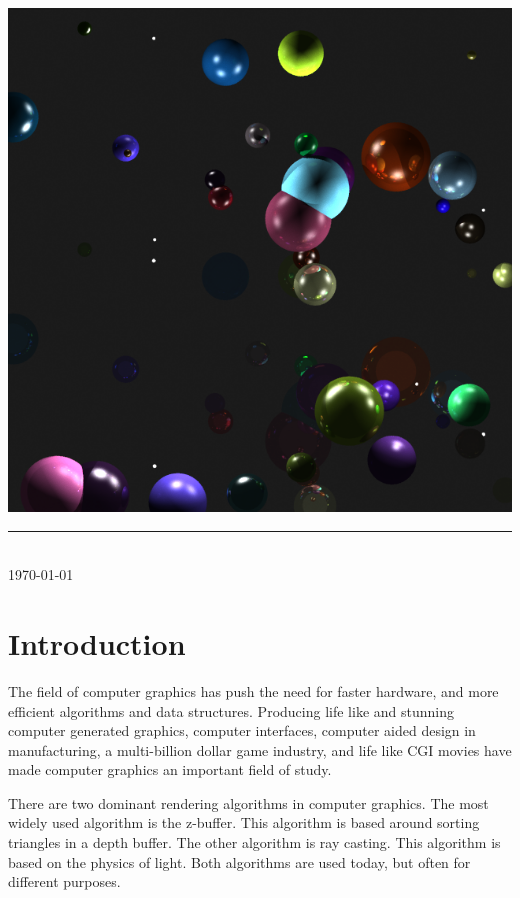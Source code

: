 \documentclass[11pt,a4paper,oneside]{article}
\newcommand{\HRule}{\rule{\linewidth}{0.5mm}}
\begin{document}
\begin{titlepage}
\begin{center}
		\begin{center}
			\includegraphics[scale=0.45]{cover.png} 
		\end{center}
	
    
        \HRule\\[0.5cm]
        { \large \today }
    \end{center}
\end{titlepage}

\begin{abstract}



\end{abstract}
\newpage 

\section{ Introduction }
The field of computer graphics has push the need for faster hardware,  and more efficient algorithms and data structures.  Producing life like and stunning computer generated graphics,  computer interfaces, computer aided design in manufacturing, a multi-billion dollar game industry, and life like CGI movies\cite{gaming:2007} have made computer graphics an important field of study.

There are two dominant rendering algorithms in computer graphics.  The most widely used algorithm is the z-buffer.  This algorithm is based around sorting triangles in a depth buffer.  The other algorithm is ray casting.  This algorithm is based on the physics of light.  Both algorithms are used today, but often for different purposes.  
\end{document}
